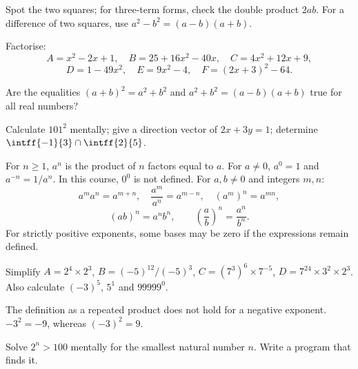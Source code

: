 \begin{method}
Spot the two squares; for three-term forms, check the double product $2ab$. For a difference of two squares, use $a^2-b^2=(a-b)(a+b)$.
\end{method}
\begin{example}Factorise:
\[A=x^2-2x+1,\quad B=25+16x^2-40x,\quad C=4x^2+12x+9,\]
\[D=1-49x^2,\quad E=9x^2-4,\quad F=(2x+3)^2-64.\]\end{example}
\begin{example}Are the equalities $(a+b)^2=a^2+b^2$ and $a^2+b^2=(a-b)(a+b)$ true for all real numbers?\end{example}
\begin{fluency}[5--10 min]Calculate $101^2$ mentally; give a direction vector of $2x+3y=1$; determine $\intff{-1}{3}\cap\intff{2}{5}$.\end{fluency}

\begin{keypoint}
For $n\geq1$, $a^n$ is the product of $n$ factors equal to $a$. For $a\ne0$, $a^0=1$ and $a^{-n}=1/a^n$. In this course, $0^0$ is not defined.
For $a,b\ne0$ and integers $m,n$:
\[a^ma^n=a^{m+n},\quad\frac{a^m}{a^n}=a^{m-n},\quad(a^m)^n=a^{mn},\]
\[(ab)^n=a^nb^n,\qquad\left(\frac ab\right)^n=\frac{a^n}{b^n}.\]
For strictly positive exponents, some bases may be zero if the expressions remain defined.
\end{keypoint}
\begin{example}Simplify $A=2^4\times2^3$, $B=(-5)^{12}/(-5)^3$, $C=(7^3)^6\times7^{-5}$, $D=7^{24}\times3^2\times2^3$. Also calculate $(-3)^5$, $5^1$ and $99999^0$.\end{example}
\begin{pitfall}The definition as a repeated product does not hold for a negative exponent. $-3^2=-9$, whereas $(-3)^2=9$.\end{pitfall}
\begin{example}Solve $2^n>100$ mentally for the smallest natural number $n$. Write a program that finds it.\end{example}

